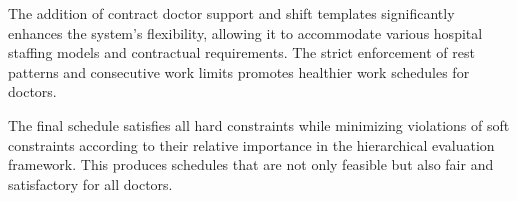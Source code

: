 \documentclass[12pt]{article}
\begin{document}
The addition of contract doctor support and shift templates significantly enhances the system's flexibility, allowing it to accommodate various hospital staffing models and contractual requirements. The strict enforcement of rest patterns and consecutive work limits promotes healthier work schedules for doctors.

The final schedule satisfies all hard constraints while minimizing violations of soft constraints according to their relative importance in the hierarchical evaluation framework. This produces schedules that are not only feasible but also fair and satisfactory for all doctors.
\end{document}
